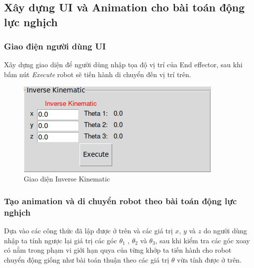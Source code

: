 \subsection{Xây dựng UI và Animation cho bài toán động lực nghịch}
\subsubsection{Giao điện người dùng UI}

Xây dựng giao diện để người dùng nhập tọa độ vị trí của End effector, sau khi bấm nút \textit{Execute} robot sẽ tiến hành di chuyển đến vị trí trên.

\begin{figure}[H]
	\centering
	\includegraphics[width=1\linewidth]{Images/inv_ui.png}
	\caption{Giao diện Inverse Kinematic}
	\label{fig:enter-label8}
\end{figure}

\subsubsection{Tạo animation và di chuyển robot theo bài toán động lực nghịch}

Dựa vào các công thức đã lập được ở trên và các giá trị $x$, $y$ và $z$ do người dùng nhập ta tính ngược lại giá trị các góc $\theta_{1}$ , $\theta_{2}$ và $\theta_{3}$, sau khi kiểm tra các góc xoay có nằm trong phạm vi giới hạn quya của từng khớp ta tiến hành cho robot chuyển động giống như bài toán thuận theo các giá trị $\theta$ vừa tính được ở trên.

